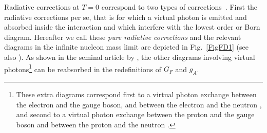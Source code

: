\documentclass[onecolumn,float,floatfix,preprintnumbers,aps,rmp,nofootinbib,amsmath,amssymb,amsfonts,superscriptaddress,tightenlines]{revtex4}
\begin{document}
Radiative corrections at $T=0$ correspond to two types of
corrections~\citep{Sirlin1967,Dicus1968,Dicus1982,Kernan}. First the
radiative corrections per se, that is for which a virtual photon is
emitted and absorbed inside the interaction and which interfere
with the lowest order or Born diagram. Hereafter we call
these {\it pure radiative corrections} and the relevant diagrams in the
infinite nucleon mass limit are depicted in Fig.~\ref{FigFD1} (see
also \citet[App. C]{Ivanov:2012qe}). As shown in the seminal article
by \citet{Sirlin1967}, the other diagrams involving virtual
photons\footnote{These extra diagrams correspond first to a virtual photon
  exchange between the electron and the gauge boson, and between the
  electron and the neutron \citep[Fig. 1]{Sirlin1967}, and second to
  a virtual photon exchange between the proton and the
gauge boson and between the proton and the neutron
\citep[Fig. 3]{Sirlin1967}.} can be reabsorbed in the redefinitions of
$G_F$ and $g_A$. 
\end{document}
